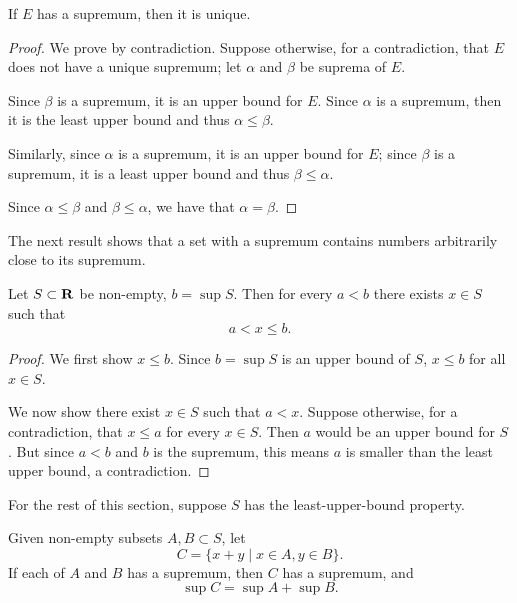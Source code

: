 \begin{proposition}
If $E$ has a supremum, then it is unique.
\end{proposition}

\begin{proof}
We prove by contradiction. Suppose otherwise, for a contradiction, that $E$ does not have a unique supremum; let $\alpha$ and $\beta$ be suprema of $E$.

Since $\beta$ is a supremum, it is an upper bound for $E$. Since $\alpha$ is a supremum, then it is the least upper bound and thus $\alpha\le\beta$. 

Similarly, since $\alpha$ is a supremum, it is an upper bound for $E$; since $\beta$ is a supremum, it is a least upper bound and thus $\beta\le\alpha$.

Since $\alpha\le\beta$ and $\beta\le\alpha$, we have that $\alpha=\beta$.
\end{proof}

The next result shows that a set with a supremum contains numbers arbitrarily close to its supremum.

\begin{proposition}\label{prop:sup-approx}
Let $S\subset\mathbf R$ be non-empty, $b=\sup S$. Then for every $a<b$ there exists $x\in S$ such that
\[a<x\le b.\]
\end{proposition}

\begin{proof}
We first show $x\le b$. Since $b=\sup S$ is an upper bound of $S$, $x\le b$ for all $x\in S$.

We now show there exist $x\in S$ such that $a<x$. Suppose otherwise, for a contradiction, that $x\le a$ for every $x\in S$. Then $a$ would be an upper bound for $S$. But since $a<b$ and $b$ is the supremum, this means $a$ is smaller than the least upper bound, a contradiction.
\end{proof}

For the rest of this section, suppose $S$ has the least-upper-bound property.

\begin{proposition}
Given non-empty subsets $A,B\subset S$, let
\[C=\{x+y\mid x\in A,y\in B\}.\]
If each of $A$ and $B$ has a supremum, then $C$ has a supremum, and
\[\sup C=\sup A+\sup B.\]
\end{proposition}

